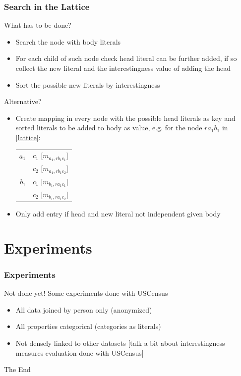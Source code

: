 \documentclass{beamer}
\begin{document}
\begin{frame}
\frametitle{Search in the Lattice}
   What has to be done?
  \begin{itemize}
   \item Search the node with body literals
   \item For each child of such node check head literal can be further added, if so collect the new literal and the
interestingness value of adding the head
   \item Sort the possible new literals by interestingness
  \end{itemize}
  Alternative?
  \begin{itemize}
   \item Create mapping in every node with the possible head literals as key and sorted literals to be added to body as
value, e.g. for the node $r a_1 b_1$ in \ref{lattice}:
   \begin{center}
    \begin{tabular}{r | l}
      $a_1$ 	& $c_1$ [$m_{a_1,rb_1c_1}$] \\
		& $c_2$ [$m_{a_1,rb_1c_2}$] \\
      \hline
      $b_1$	& $c_1$ [$m_{b_1,ra_1c_1}$] \\
		& $c_2$ [$m_{b_1,ra_1c_2}$]
    \end{tabular}
   \end{center}
   \item Only add entry if head and new literal not independent given body
  \end{itemize}
\end{frame}

\section{Experiments}

\begin{frame}
\frametitle{Experiments}
  Not done yet!
  Some experiments done with USCensus
  \begin{itemize}
   \item All data joined by person only (anonymized)
   \item All properties categorical (categories as literals)
   \item Not densely linked to other datasets
   [talk a bit about interestingness measures evaluation done with USCensus]
  \end{itemize}
\end{frame}



\begin{frame}
\Huge{\centerline{The End}}
\end{frame}

\end{document}
